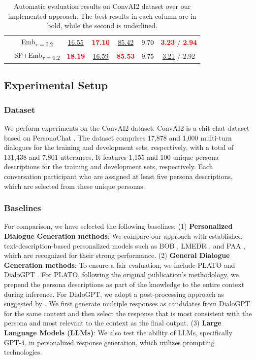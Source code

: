 \documentclass[letterpaper]{article} %
\begin{document}
\begin{table}[ht]
\begin{tabular}{|c|c|c|c|c|c|c|}
\multirow{3}{*}{} &Emb\textsubscript{$\tau=0.2$}   &\underline{16.55}  &\textbf{\textcolor{red}{17.10}}	&\underline{85.42} &9.70 &\textbf{\textcolor{red}{3.23}} / \textbf{\textcolor{red}{2.94}}	\\
\cline{2-7}

\multirow{3}{*}{} &SP+Emb\textsubscript{$\tau=0.2$}   &\textbf{\textcolor{red}{18.19}}	&\underline{16.59}	&\textbf{\textcolor{red}{85.53}} &9.75 &\underline{3.21} / 2.92 \\
\hline
\end{tabular}
\caption{Automatic evaluation results on ConvAI2 dataset over our implemented approach. The best results in each column are in bold, while the second is underlined.}
\label{table:main-results}
\end{table}

\subsection{Experimental Setup}
\subsubsection{Dataset}
We perform experiments on the ConvAI2 dataset. ConvAI2 \cite{dinan-etal-2019-convai2} is a chit-chat dataset based on PersonaChat \cite{zhang-etal-2018-personalizing}. The dataset comprises 17,878 and 1,000 multi-turn dialogues for the training and development sets, respectively, with a total of 131,438 and 7,801 utterances. It features 1,155 and 100 unique persona descriptions for the training and development sets, respectively. Each conversation participant who are assigned at least five persona descriptions, which are selected from these unique personas.

\subsubsection{Baselines}
For comparison, we have selected the following baselines: (1) \textbf{Personalized Dialogue Generation methods}: We compare our approach with established text-description-based personalized models such as BOB \cite{song-etal-2021-bob}, LMEDR \cite{chen-etal-2023-memorize}, and PAA \cite{huang-etal-2023-paa}, which are recognized for their strong performance. (2) \textbf{General Dialogue Generation methods}: To ensure a fair evaluation, we include PLATO \cite{bao-etal-2020-plato} and DialoGPT \cite{zhang-etal-2019-dialogpt}. For PLATO, following the original publication's methodology, we prepend the persona descriptions as part of the knowledge to the entire context during inference. For DialoGPT, we adopt a post-processing approach as suggested by \cite{zhou-etal-2023-simoap}. We first generate multiple responses as candidates from DialoGPT for the same context and then select the response that is most consistent with the persona and most relevant to the context as the final output. (3) \textbf{Large Language Models (LLMs)}: We also test the ability of LLMs, specifically GPT-4, in personalized response generation, which utilizes prompting technologies.
\end{document}
